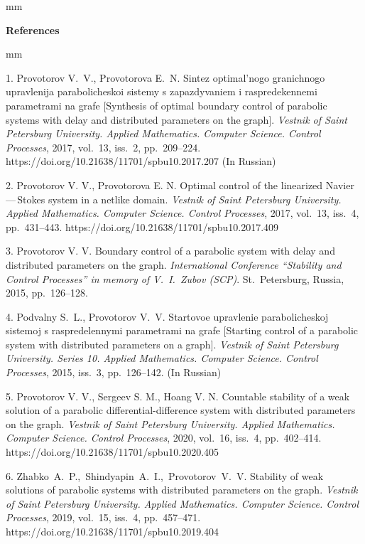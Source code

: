 

{\small



 mm

\noindent \textbf{References} }

 mm

{\footnotesize



1. Provotorov V.~V., Provotorova E.~N. Sintez optimal'nogo granichnogo upravlenija parabolicheskoi sistemy s zapazdyvaniem i raspredekennemi parametrami na grafe [Synthesis of optimal boundary control of parabolic systems with delay and distributed parameters on the graph]. \textit{Vestnik of Saint Petersburg University. Applied Mathematics. Computer Science. Control Processes}, 2017, vol.~13, iss.~2, pp.~209--224. https://doi.org/10.21638/11701/spbu10.2017.207 (In Russian)

2. Provotorov V. V., Provotorova E. N. Optimal control of the linearized Navier\,---\,Stokes system in a netlike domain. \emph{Vestnik of Saint Petersburg University.  Applied Mathematics. Computer Science. Control Processes}, 2017, vol.~13, iss.~4, pp.~431--443.
https://doi.org/10.21638/11701/spbu10.2017.409

3. Provotorov V. V. Boundary control of a parabolic system with delay and distributed parameters on the graph. \emph{International Conference ``Stability and Control Processes'' in memory of V.~I.~Zubov (SCP)}. St.~Petersburg, Russia, 2015, pp.~126--128.

4. Podvalny S.~L., Provotorov V.~V. Startovoe upravlenie parabolicheskoj sistemoj s raspredelennymi parametrami na grafe [Starting control of a parabolic system with distributed
parameters on a graph]. \textit{Vestnik of Saint Petersburg University. Series 10. Applied Mathematics. Computer Science. Control Processes}, 2015, iss.~3, pp.~126--142. (In Russian)

5. Provotorov V. V., Sergeev S. M., Hoang V. N. Countable stability of a weak solution of a parabolic differential-difference system with distributed parameters on the graph. \emph{Vestnik of Saint Petersburg Uni\-ver\-sity. Applied Mathematics. Computer Science. Control Processes}, 2020, vol.~16, iss.~4, pp.~402--414. https://doi.org/10.21638/11701/spbu10.2020.405


6. Zhabko~A.~P.,~Shindyapin~A.~I.,~Provotorov~V.~V.  Stability of weak solutions of pa\-ra\-bo\-lic systems with distributed parameters on the graph. \textit{Vestnik of Saint Petersburg University. Ap\-plied Mathematics. Computer Science. Control Processes}, 2019, vol.~15, iss.~4, pp.~457--471.\\ https://doi.org/10.21638/11701/spbu10.2019.404

}
